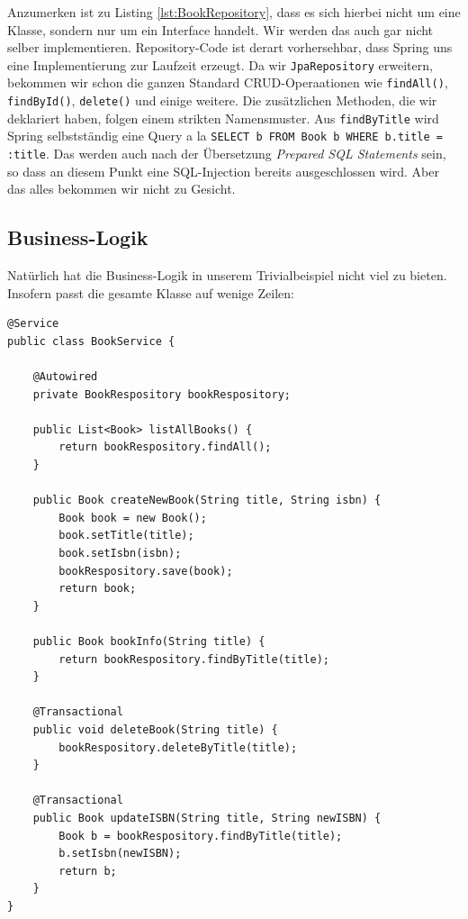 Anzumerken ist zu Listing \ref{lst:BookRepository}, dass es sich hierbei
nicht um eine Klasse, sondern nur um ein Interface handelt. Wir werden
das auch gar nicht selber implementieren. Repository-Code ist derart
vorhersehbar, dass Spring uns eine Implementierung zur Laufzeit erzeugt.
Da wir \texttt{JpaRepository} erweitern, bekommen wir schon die ganzen
Standard CRUD-Operaationen wie \texttt{findAll()}, \texttt{findById()}, 
\texttt{delete()} und einige weitere.
Die zusätzlichen Methoden, die wir deklariert haben, folgen einem strikten
Namensmuster. Aus \texttt{findByTitle} wird Spring selbstständig eine
Query a la \texttt{SELECT b FROM Book b WHERE b.title = :title}. Das werden
auch nach der Übersetzung \textit{Prepared SQL Statements} sein, so dass
an diesem Punkt eine SQL-Injection bereits ausgeschlossen wird. Aber das
alles bekommen wir nicht zu Gesicht.

\subsection{Business-Logik}
Natürlich hat die Business-Logik in unserem Trivialbeispiel nicht viel zu 
bieten. Insofern passt die gesamte Klasse auf wenige Zeilen: 

\begin{listing}[H]
\begin{verbatim}
@Service
public class BookService {
    
    @Autowired
    private BookRespository bookRespository;

    public List<Book> listAllBooks() {
        return bookRespository.findAll();
    }

    public Book createNewBook(String title, String isbn) {
        Book book = new Book();
        book.setTitle(title);
        book.setIsbn(isbn);
        bookRespository.save(book);
        return book;
    }

    public Book bookInfo(String title) {
        return bookRespository.findByTitle(title);
    }

    @Transactional
    public void deleteBook(String title) {
        bookRespository.deleteByTitle(title);
    }

    @Transactional
    public Book updateISBN(String title, String newISBN) {
        Book b = bookRespository.findByTitle(title);
        b.setIsbn(newISBN);
        return b;
    }
}
\end{verbatim}
\caption{BookService - Implementierung der Business-Logik}
\label{lst:BookService}
\end{listing}

